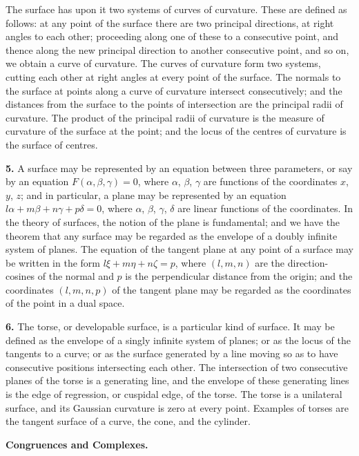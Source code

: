 \documentclass[11pt,a4paper]{article}
\begin{document}
The surface has upon it two systems of curves of curvature. These are defined as follows: at any point of the surface there are two principal directions, at right angles to each other; proceeding along one of these to a consecutive point, and thence along the new principal direction to another consecutive point, and so on, we obtain a curve of curvature. The curves of curvature form two systems, cutting each other at right angles at every point of the surface. The normals to the surface at points along a curve of curvature intersect consecutively; and the distances from the surface to the points of intersection are the principal radii of curvature. The product of the principal radii of curvature is the measure of curvature of the surface at the point; and the locus of the centres of curvature is the surface of centres.

\textbf{5.}\quad
A surface may be represented by an equation between three parameters, or say by an equation $F(\alpha, \beta, \gamma) = 0$, where $\alpha$, $\beta$, $\gamma$ are functions of the coordinates $x$, $y$, $z$; and in particular, a plane may be represented by an equation $l\alpha + m\beta + n\gamma + p\delta = 0$, where $\alpha$, $\beta$, $\gamma$, $\delta$ are linear functions of the coordinates. In the theory of surfaces, the notion of the plane is fundamental; and we have the theorem that any surface may be regarded as the envelope of a doubly infinite system of planes. The equation of the tangent plane at any point of a surface may be written in the form $l\xi + m\eta + n\zeta = p$, where $(l, m, n)$ are the direction-cosines of the normal and $p$ is the perpendicular distance from the origin; and the coordinates $(l, m, n, p)$ of the tangent plane may be regarded as the coordinates of the point in a dual space.

\textbf{6.}\quad
The torse, or developable surface, is a particular kind of surface. It may be defined as the envelope of a singly infinite system of planes; or as the locus of the tangents to a curve; or as the surface generated by a line moving so as to have consecutive positions intersecting each other. The intersection of two consecutive planes of the torse is a generating line, and the envelope of these generating lines is the edge of regression, or cuspidal edge, of the torse. The torse is a unilateral surface, and its Gaussian curvature is zero at every point. Examples of torses are the tangent surface of a curve, the cone, and the cylinder.

\bigskip
\noindent\textbf{Congruences and Complexes.}
\end{document}
